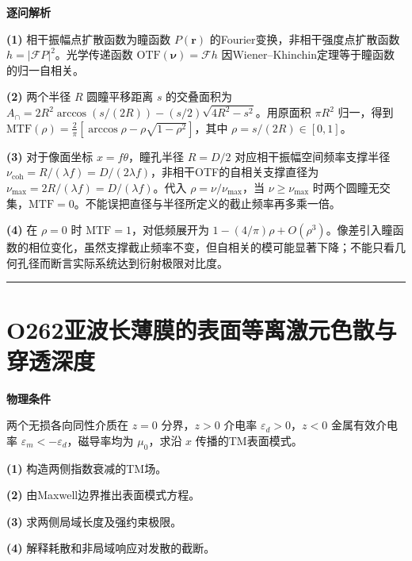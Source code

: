 \documentclass[UTF8,a4paper,11pt,oneside,openany]{ctexbook}
\begin{document}
\par\medskip\noindent\textbf{逐问解析}
\par\noindent\textbf{(1)} 相干振幅点扩散函数为瞳函数 \(P(\boldsymbol r)\) 的Fourier变换，非相干强度点扩散函数 \(h=|\mathcal F P|^2\)。光学传递函数 \(\mathrm{OTF}(\boldsymbol\nu)=\mathcal F h\) 因Wiener–Khinchin定理等于瞳函数的归一自相关。
\par\noindent\textbf{(2)} 两个半径 \(R\) 圆瞳平移距离 \(s\) 的交叠面积为 \(A_\cap=2R^2\arccos(s/(2R))-(s/2)\sqrt{4R^2-s^2}\)。用原面积 \(\pi R^2\) 归一，得到 \(\mathrm{MTF}(\rho)=\frac2\pi[\arccos\rho-\rho\sqrt{1-\rho^2}]\)，其中 \(\rho=s/(2R)\in[0,1]\)。
\par\noindent\textbf{(3)} 对于像面坐标 \(x=f\theta\)，瞳孔半径 \(R=D/2\) 对应相干振幅空间频率支撑半径 \(\nu_{\mathrm{coh}}=R/(\lambda f)=D/(2\lambda f)\)，非相干OTF的自相关支撑直径为 \(\nu_{\max}=2R/(\lambda f)=D/(\lambda f)\)。代入 \(\rho=\nu/\nu_{\max}\)，当 \(\nu\ge\nu_{\max}\) 时两个圆瞳无交集，\(\mathrm{MTF}=0\)。不能误把直径与半径所定义的截止频率再多乘一倍。
\par\noindent\textbf{(4)} 在 \(\rho=0\) 时 \(\mathrm{MTF}=1\)，对低频展开为 \(1-(4/\pi)\rho+O(\rho^3)\)。像差引入瞳函数的相位变化，虽然支撑截止频率不变，但自相关的模可能显著下降；不能只看几何孔径而断言实际系统达到衍射极限对比度。

\par\bigskip\hrule\bigskip
\section*{O262\quad 亚波长薄膜的表面等离激元色散与穿透深度}
\textbf{物理条件}\par 两个无损各向同性介质在 \(z=0\) 分界，\(z>0\) 介电率 \(\varepsilon_d>0\)，\(z<0\) 金属有效介电率 \(\varepsilon_m<-\varepsilon_d\)，磁导率均为 \(\mu_0\)，求沿 \(x\) 传播的TM表面模式。
\par\noindent\textbf{(1)} 构造两侧指数衰减的TM场。
\par\noindent\textbf{(2)} 由Maxwell边界推出表面模式方程。
\par\noindent\textbf{(3)} 求两侧局域长度及强约束极限。
\par\noindent\textbf{(4)} 解释耗散和非局域响应对发散的截断。
\end{document}
